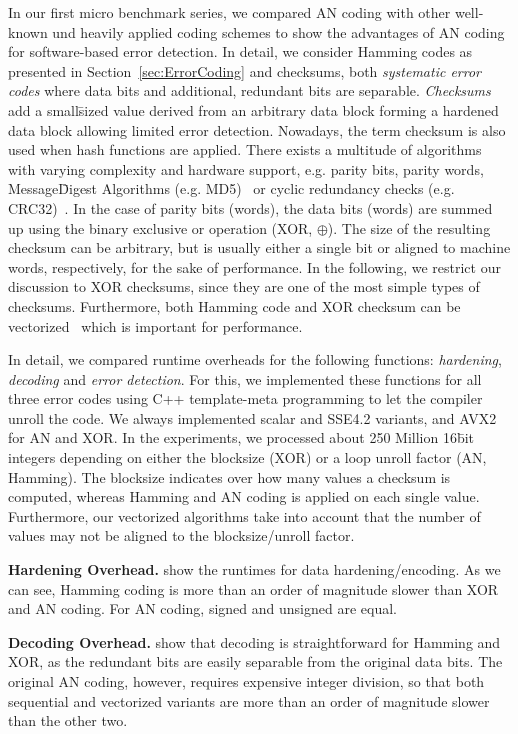 In our first micro benchmark series, we compared AN coding with other well-known und heavily applied coding schemes to show the advantages of AN coding for software-based error detection. In detail, we consider Hamming codes as presented in Section~\ref{sec:ErrorCoding} and checksums, both \emph{systematic error codes} where data bits and additional, redundant bits are separable. \emph{Checksums} add a small\=sized value derived from an arbitrary data block forming a hardened data block allowing limited error detection. Nowadays, the term checksum is also used when hash functions are applied. There exists a multitude of algorithms with varying complexity and hardware support, e.g. parity bits, parity words, Message\=Digest Algorithms (e.g. MD5)~\cite{md5,Sivathanu2005} or cyclic redundancy checks (e.g. CRC32)~\cite{peterson1961cyclic,Sivathanu2005}. In the case of parity bits (words), the data bits (words) are summed up using the binary exclusive or operation (XOR, \(\oplus\)). The size of the resulting checksum can be arbitrary, but is usually either a single bit or aligned to machine words, respectively, for the sake of performance. In the following, we restrict our discussion to XOR checksums, since they are one of the most simple types of checksums. Furthermore, both Hamming code and XOR checksum can be vectorized~\cite{mula2016avx2popcount,warren2013hacker} which is important for performance. 

In detail, we compared runtime overheads for the following functions: \emph{hardening}, \emph{decoding} and \emph{error detection}. For this, we implemented these functions for all three error codes using C++ template-meta programming to let the compiler unroll the code. We always implemented scalar and SSE4.2 variants, and AVX2 for AN and XOR. In the experiments, we processed about 250 Million 16\=bit integers depending on either the blocksize (XOR) or a loop unroll factor (AN, Hamming). The blocksize indicates over how many values a checksum is computed, whereas Hamming and AN coding is applied on each single value. Furthermore, our vectorized algorithms take into account that the number of values may not be aligned to the blocksize/unroll factor. 

\textbf{Hardening Overhead.}
 show the runtimes for data hardening/encoding. As we can see, Hamming coding is more than an order of magnitude slower than XOR and AN coding. For AN coding, signed and unsigned are equal.

\textbf{Decoding Overhead.}
 show that decoding is straightforward for Hamming and XOR, as the redundant bits are easily separable from the original data bits. The original AN coding, however, requires expensive integer division, so that both sequential and vectorized variants are more than an order of magnitude slower than the other two.

